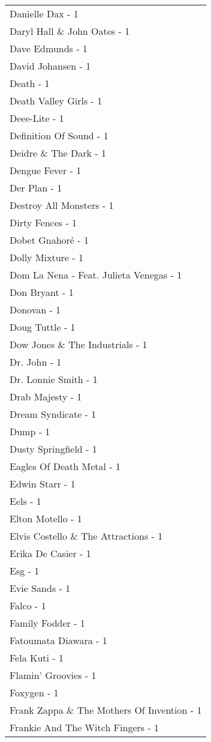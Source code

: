 \documentclass[
]{article}
\begin{document}
\begin{longtable}{l}
Danielle Dax - 1 \\ 
Daryl Hall \& John Oates - 1 \\ 
Dave Edmunds - 1 \\ 
David Johansen - 1 \\ 
Death - 1 \\ 
Death Valley Girls - 1 \\ 
Deee-Lite - 1 \\ 
Definition Of Sound - 1 \\ 
Deidre \& The Dark - 1 \\ 
Dengue Fever - 1 \\ 
Der Plan - 1 \\ 
Destroy All Monsters - 1 \\ 
Dirty Fences - 1 \\ 
Dobet Gnahoré - 1 \\ 
Dolly Mixture - 1 \\ 
Dom La Nena - Feat. Julieta Venegas - 1 \\ 
Don Bryant - 1 \\ 
Donovan - 1 \\ 
Doug Tuttle - 1 \\ 
Dow Jones \& The Industrials - 1 \\ 
Dr. John - 1 \\ 
Dr. Lonnie Smith - 1 \\ 
Drab Majesty - 1 \\ 
Dream Syndicate - 1 \\ 
Dump - 1 \\ 
Dusty Springfield - 1 \\ 
Eagles Of Death Metal - 1 \\ 
Edwin Starr - 1 \\ 
Eels - 1 \\ 
Elton Motello - 1 \\ 
Elvis Costello \& The Attractions - 1 \\ 
Erika De Casier - 1 \\ 
Esg - 1 \\ 
Evie Sands - 1 \\ 
Falco - 1 \\ 
Family Fodder - 1 \\ 
Fatoumata Diawara - 1 \\ 
Fela Kuti - 1 \\ 
Flamin' Groovies - 1 \\ 
Foxygen - 1 \\ 
Frank Zappa \& The Mothers Of Invention - 1 \\ 
Frankie And The Witch Fingers - 1 \\ 

\end{longtable}
\end{document}
